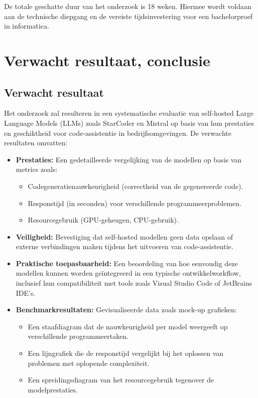 De totale geschatte duur van het onderzoek is 18 weken. Hiermee wordt voldaan aan de technische diepgang en de vereiste tijdsinvestering voor een bachelorproef in informatica.

\section{Verwacht resultaat, conclusie}%
\label{sec:verwachte_resultaten}

\subsection{Verwacht resultaat}

Het onderzoek zal resulteren in een systematische evaluatie van self-hosted Large Language Models (LLMs) zoals StarCoder en Mistral op basis van hun prestaties en geschiktheid voor code-assistentie in bedrijfsomgevingen. De verwachte resultaten omvatten:

\begin{itemize}
    \item \textbf{Prestaties:} Een gedetailleerde vergelijking van de modellen op basis van metrics zoals:
    \begin{itemize}
        \item Codegeneratienauwkeurigheid (correctheid van de gegenereerde code).
        \item Responstijd (in seconden) voor verschillende programmeerproblemen.
        \item Resourcegebruik (GPU-geheugen, CPU-gebruik).
    \end{itemize}

    \item \textbf{Veiligheid:} Bevestiging dat self-hosted modellen geen data opslaan of externe verbindingen maken tijdens het uitvoeren van code-assistentie.

    \item \textbf{Praktische toepasbaarheid:} Een beoordeling van hoe eenvoudig deze modellen kunnen worden geïntegreerd in een typische ontwikkelworkflow, inclusief hun compatibiliteit met tools zoals Visual Studio Code of JetBrains IDE's.

    \item \textbf{Benchmarkresultaten:} Gevisualiseerde data zoals mock-up grafieken:
    \begin{itemize}
        \item Een staafdiagram dat de nauwkeurigheid per model weergeeft op verschillende programmeertaken.
        \item Een lijngrafiek die de responstijd vergelijkt bij het oplossen van problemen met oplopende complexiteit.
        \item Een spreidingsdiagram van het resourcegebruik tegenover de modelprestaties.
    \end{itemize}
\end{itemize}

